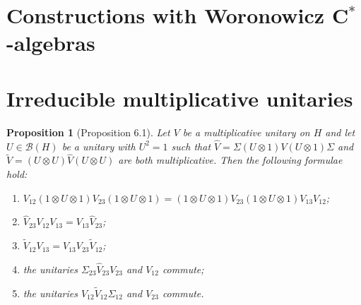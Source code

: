 \documentclass[a4paper,12pt]{article}
\theoremstyle{plain}
\newtheorem{proposition}{Proposition}[section]
\theoremstyle{definition}
\newcommand{\mc}{\mathcal}
\begin{document}
\section{Constructions with Woronowicz C$^*$-algebras}\label{sec:5}





\section{Irreducible multiplicative unitaries}

\begin{proposition}[Proposition 6.1]\label{prop:10}
Let $V$ be a multiplicative unitary on $H$ and let $U\in\mc B(H)$ be a unitary
with $U^2=1$ such that $\hat V=\Sigma(U\otimes 1)V(U\otimes 1)\Sigma$
and $\tilde V=(U\otimes U)\hat V(U\otimes U)$ are both multiplicative.
Then the following formulae hold:
\begin{enumerate}
\item\label{prop:10.1} $V_{12} (1\otimes U\otimes 1) V_{23}
(1\otimes U\otimes 1)
= (1\otimes U\otimes 1)V_{23}(1\otimes U\otimes 1)V_{13} V_{12}$;
\item\label{prop:10.2} $\hat V_{23} V_{12} V_{13} = V_{13} \hat V_{23}$;
\item\label{prop:10.3} $\tilde V_{12} V_{13} = V_{13} V_{23} \tilde V_{12}$;
\item\label{prop:10.4} the unitaries $\Sigma_{23} \hat V_{23} V_{23}$ and
$V_{12}$ commute;
\item\label{prop:10.5} the unitaries $V_{12} \tilde V_{12} \Sigma_{12}$ and
$V_{23}$ commute.
\end{enumerate}
\end{proposition}
\end{document}
